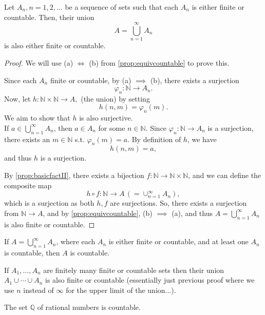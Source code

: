 \documentclass[12pt]{article}
\begin{document}
\begin{theorem}\label{thm:infiniteunion}
  Let $A_n, n = 1,2,\dots$ be a sequence of sets such that each $A_n$ is either finite or countable. Then, their union \[A = \bigcup_{n=1}^\infty A_n\] is also either finite or countable.
\end{theorem}

\begin{proof}
  We will use (a) $\iff$ (b) from \cref{prop:equivcountable} to prove this.

  Since each $A_n$ finite or countable, by (a) $\implies$ (b), there exists a surjection $$\varphi_n: \mathbb{N} \to A_n.$$ Now, let $h: \mathbb{N} \times \mathbb{N} \to A,$ (the union) by setting \[h(n,m) = \varphi_n(m).\] We aim to show that $h$ is also surjective.\\ If $a \in \bigcup_{n=1}^\infty A_n$, then $a \in A_n$ for some $n \in \mathbb{N}$. Since $\varphi_n : \mathbb{N} \to A_n$ is a surjection, there exists an $m \in \mathbb{N}$ s.t. $\varphi_n(m) = a$. By definition of $h$, we have \[h(n,m) = a,\] and thus $h$ is a surjection.

  By \cref{prop:basicfactII}, there exists a bijection $f: \mathbb{N} \to \mathbb{N} \times \mathbb{N}$, and we can define the composite map \[h \circ f : \mathbb{N} \to A\,(= \cup_{n=1}^\infty A_n),\] which is a surjection as both $h,f$ are surjections. So, there exists a surjection from $\mathbb{N} \to A$, and by \cref{prop:equivcountable}, (b) $\implies$ (a), and thus $A = \bigcup_{n=1}^\infty A_n$ is also finite or countable.

\end{proof}

\begin{remark}
  If $A = \bigcup_{n=1}^\infty A_n$, where each $A_n$ is either finite or countable, and at least one $A_n$ is countable, then $A$ is countable.
\end{remark}

\begin{remark}
  If $A_1, \dots,  A_n$ are finitely many finite or countable sets then their union $A_1 \cup \cdots \cup A_n$ is also finite or countable (essentially just previous proof where we use $n$ instead of $\infty$ for the upper limit of the union...). 
\end{remark}

\begin{theorem}\label{thm:countablerationals}
  The set $\mathbb{Q}$ of rational numbers is countable.
\end{theorem}
\end{document}
